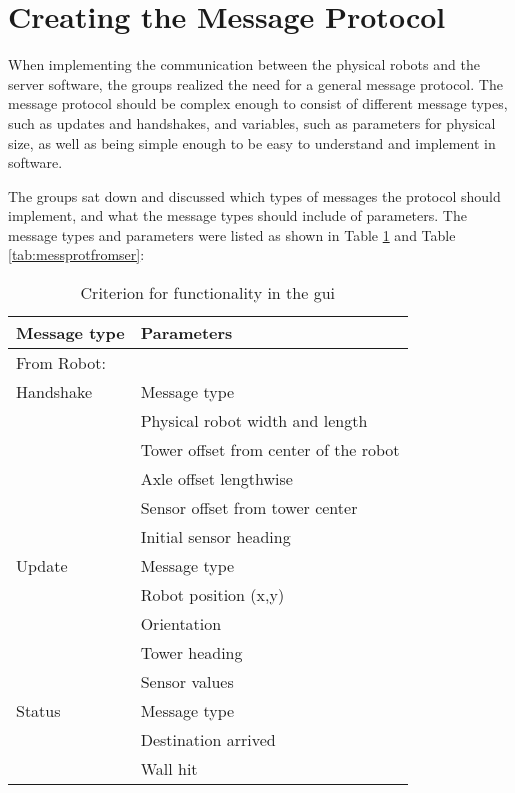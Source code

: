\section{Creating the Message Protocol}
When implementing the communication between the physical robots and the server software, the groups realized the need for a general message protocol. The message protocol should be complex enough to consist of different message types, such as updates and handshakes, and variables, such as parameters for physical size, as well as being simple enough to be easy to understand and implement in software.

The groups sat down and discussed which types of messages the protocol should implement, and what the message types should include of parameters. The message types and parameters were listed as shown in Table \ref{tab:messprotfromrob} and Table \ref{tab:messprotfromser}:

\begin{table}[ht]
\begin{center}
 \begin{tabular}{|l | l|} 
 \hline
 Message type       &	Parameters \\
 \hline
 \hline
 From Robot: & \\
 \hline
 Handshake          &   Message type \\
 					&	Physical robot width and length  \\
                    &   Tower offset from center of the robot\\
                    &	Axle offset lengthwise \\
                    &	Sensor offset from tower center \\
                    &	Initial sensor heading \\
 \hline
 Update  			&   Message type \\
                    &   Robot position (x,y) \\
                    &   Orientation \\
                    &   Tower heading \\
                    &	Sensor values \\
 \hline
 Status		        &   Message type \\
 					&	Destination arrived \\
                    &   Wall hit \\
 \hline
 \end{tabular}
\end{center}
\caption{Criterion for functionality in the \acrshort{gui}}
\label{tab:messprotfromrob}
\end{table}

